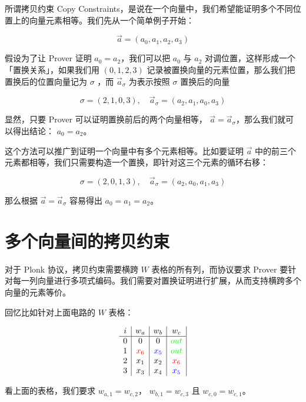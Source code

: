 所谓拷贝约束 Copy
Constraints，是说在一个向量中，我们希望能证明多个不同位置上的向量元素相等。我们先从一个简单例子开始：

\[
\vec{a}=(a_0, a_1, a_2, a_3)
\]

假设为了让 Prover 证明 \(a_0=a_2\)，我们可以把 \(a_0\) 与 \(a_2\)
对调位置，这样形成一个「置换关系」，如果我们用 \((0,1,2,3)\)
记录被置换向量的元素位置，那么我们把置换后的位置向量记为 \(\sigma\) ，而
\(\vec{a}_\sigma\) 为表示按照 \(\sigma\) 置换后的向量

\[
\sigma=(2,1,0,3), \quad \vec{a}_\sigma=(a_2,a_1,a_0, a_3)
\]

显然，只要 Prover 可以证明置换前后的两个向量相等，
\(\vec{a}=\vec{a}_\sigma\)，那么我们就可以得出结论： \(a_0=a_2\)。

这个方法可以推广到证明一个向量中有多个元素相等。比如要证明 \(\vec{a}\)
中的前三个元素都相等，我们只需要构造一个置换，即针对这三个元素的循环右移：

\[
\sigma=(2,0,1,3),\quad \vec{a}_\sigma=(a_2,a_0,a_1,a_3)
\]

那么根据 \(\vec{a}=\vec{a}_\sigma\) 容易得出 \(a_0=a_1=a_2\)。

\hypertarget{ux591aux4e2aux5411ux91cfux95f4ux7684ux62f7ux8d1dux7ea6ux675f}{%
\section{多个向量间的拷贝约束}\label{ux591aux4e2aux5411ux91cfux95f4ux7684ux62f7ux8d1dux7ea6ux675f}}

对于 Plonk 协议，拷贝约束需要横跨 \(W\) 表格的所有列，而协议要求 Prover
要针对每一列向量进行多项式编码。我们需要对置换证明进行扩展，从而支持横跨多个向量的元素等价。


回忆比如针对上面电路的 \(W\) 表格：

\[
\begin{array}{c|c|c|c|}
i & w_a & w_b & w_c  \\
\hline
0 & 0 & 0 & {\color{green}out} \\
1 & {\color{red}x_6} & {\color{blue}x_5} & {\color{green}out} \\
2 & x_1 & x_2 & {\color{red}x_6} \\
3 & x_3 & x_4 & {\color{blue}x_5} \\
\end{array}
\]

看上面的表格，我们要求 \(w_{a,1}=w_{c,2}\)， \(w_{b,1}=w_{c,3}\) 且
\(w_{c,0}=w_{c,1}\)。

